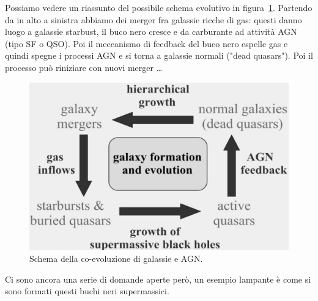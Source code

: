 Possiamo vedere un riassunto del possibile schema evolutivo in figura~\ref{fig:coevolution-galassie-agn}. Partendo da in alto a sinistra abbiamo dei merger fra galassie ricche di gas: questi danno luogo a galassie starbust, il buco nero cresce e da carburante ad attività AGN (tipo SF o QSO). Poi il meccanismo di feedback del buco nero espelle gas e quindi spegne i processi AGN e si torna a galassie normali ("dead quasars"). Poi il processo può riniziare con nuovi merger \dots

\begin{figure}[htb]
    \centering
    \includegraphics[width = 0.4 \textwidth]{immagini/coevolution-galassie-agn.png}
    \caption{Schema della co-evoluzione di galassie e AGN.}
    \label{fig:coevolution-galassie-agn}
\end{figure}

Ci sono ancora una serie di domande aperte però, un esempio lampante è come si sono formati questi buchi neri supermassici.